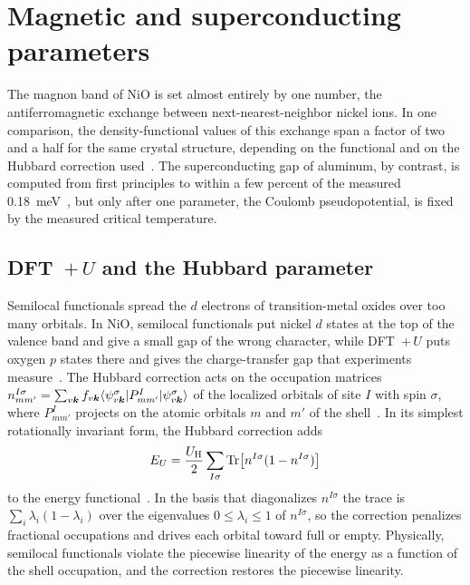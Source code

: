 \section{Magnetic and superconducting parameters}\label{app:E.9}

The magnon band of NiO is set almost entirely by one number, the antiferromagnetic exchange between next-nearest-neighbor nickel ions. In one comparison, the density-functional values of this exchange span a factor of two and a half for the same crystal structure, depending on the functional and on the Hubbard correction used~\cite[Table~III]{fischer2009exchange}. The superconducting gap of aluminum, by contrast, is computed from first principles to within a few percent of the measured \SI{0.18}{meV}~\cite[Table~III]{savrasov1996electron}, but only after one parameter, the Coulomb pseudopotential, is fixed by the measured critical temperature.

\subsection{DFT~$+\,U$ and the Hubbard parameter}

Semilocal functionals spread the $d$ electrons of transition-metal oxides over too many orbitals. In NiO, semilocal functionals put nickel $d$ states at the top of the valence band and give a small gap of the wrong character, while DFT~$+\,U$ puts oxygen $p$ states there and gives the charge-transfer gap that experiments measure~\cite[Sect.~V]{cococcioni2005linear}. The Hubbard correction acts on the occupation matrices $n^{I\sigma}_{mm'} = \sum_{v\bm{k}}f_{v\bm{k}}\langle\psi^\sigma_{v\bm{k}}|P^I_{mm'}|\psi^\sigma_{v\bm{k}}\rangle$ of the localized orbitals of site $I$ with spin $\sigma$, where $P^I_{mm'}$ projects on the atomic orbitals $m$ and $m'$ of the shell~\cite[Eqs.~(5) and~(8)]{cococcioni2005linear}. In its simplest rotationally invariant form, the Hubbard correction adds
\begin{equation}
  E_U = \frac{U_{\mathrm{H}}}{2}\sum_{I\sigma}\operatorname{Tr}\bigl[n^{I\sigma}(1 - n^{I\sigma})\bigr]
  \label{eq:E.9-U}
\end{equation}
to the energy functional~\cite[Eq.~(9)]{cococcioni2005linear}. In the basis that diagonalizes $n^{I\sigma}$ the trace is $\sum_i\lambda_i(1 - \lambda_i)$ over the eigenvalues $0 \le \lambda_i \le 1$ of $n^{I\sigma}$, so the correction penalizes fractional occupations and drives each orbital toward full or empty. Physically, semilocal functionals violate the piecewise linearity of the energy as a function of the shell occupation, and the correction restores the piecewise linearity.

